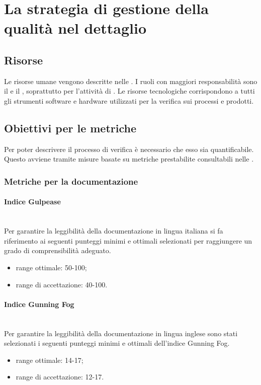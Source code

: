 \section{La strategia di gestione della qualità nel dettaglio}

\subsection{Risorse}
Le risorse umane vengono descritte nelle \NormeDiProgetto{}. I ruoli con maggiori responsabilità sono il \Responsabile{} e il \Verificatore{}, soprattutto per l'attività di \VV{}.
Le risorse tecnologiche corrispondono a tutti gli strumenti software e hardware utilizzati per la verifica sui processi e prodotti.

\subsection{Obiettivi per le metriche}\label{sec:metriche}
Per poter descrivere il processo di verifica è necessario che esso sia quantificabile. Questo avviene tramite misure basate su metriche prestabilite consultabili nelle \NormeDiProgetto{}.

\subsubsection{Metriche per la documentazione}\label{sec:metriche_documentazione}
\paragraph{Indice Gulpease}\mbox{}\\
Per garantire la leggibilità della documentazione in lingua italiana si fa riferimento ai seguenti punteggi minimi e ottimali selezionati per raggiungere un grado di comprensibilità adeguato.
\begin{itemize}
	\item range ottimale: 50-100;
	\item range di accettazione: 40-100.
\end{itemize} 

\paragraph{Indice Gunning Fog}\mbox{}\\
Per garantire la leggibilità della documentazione in lingua inglese sono stati selezionati i seguenti punteggi minimi e ottimali dell'indice Gunning Fog.
\begin{itemize}
	\item range ottimale: 14-17;
	\item range di accettazione: 12-17.
\end{itemize}

